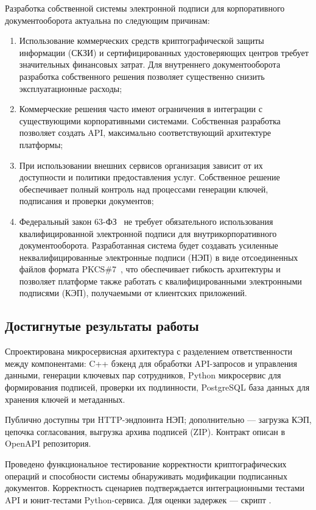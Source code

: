 \documentclass[a4paper,12pt]{extarticle}
\newcommand{\ppath}[1]{{\hypersetup{urlcolor=black}\path{#1}}}%
\begin{document}
Разработка собственной системы электронной подписи для корпоративного документооборота актуальна по следующим причинам:
\begin{enumerate}
    \item Использование коммерческих средств криптографической защиты информации (СКЗИ) и сертифицированных удостоверяющих центров требует значительных финансовых затрат. Для внутреннего документооборота разработка собственного решения позволяет существенно снизить эксплуатационные расходы;
    \item Коммерческие решения часто имеют ограничения в интеграции с существующими корпоративными системами. Собственная разработка позволяет создать API, максимально соответствующий архитектуре платформы;
    \item При использовании внешних сервисов организация зависит от их доступности и политики предоставления услуг. Собственное решение обеспечивает полный контроль над процессами генерации ключей, подписания и проверки документов;
    \item Федеральный закон 63-ФЗ~\cite{fz63} не требует обязательного использования квалифицированной электронной подписи для внутрикорпоративного документооборота. Разработанная система будет создавать усиленные неквалифицированные электронные подписи (НЭП) в виде отсоединенных файлов формата PKCS\#7~\cite{pkcs7}, что обеспечивает гибкость архитектуры и позволяет платформе также работать с квалифицированными электронными подписями (КЭП), получаемыми от клиентских приложений.
\end{enumerate}


\subsection{Достигнутые результаты работы}

Спроектирована микросервисная архитектура с разделением ответственности между компонентами: C++ бэкенд для обработки API-запросов и управления данными, генерации ключевых пар сотрудников, Python микросервис для формирования подписей, проверки их подлинности, PostgreSQL база данных для хранения ключей и метаданных.

Публично доступны три HTTP-эндпоинта НЭП; дополнительно --- загрузка КЭП, цепочка согласования, выгрузка архива подписей (ZIP). Контракт описан в OpenAPI репозитория.

Проведено функциональное тестирование корректности криптографических операций и способности системы обнаруживать модификации подписанных документов. Корректность сценариев подтверждается интеграционными тестами API и юнит-тестами Python-сервиса. Для оценки задержек --- скрипт \ppath{scripts/bench_nep_handlers.sh}.
\end{document}
